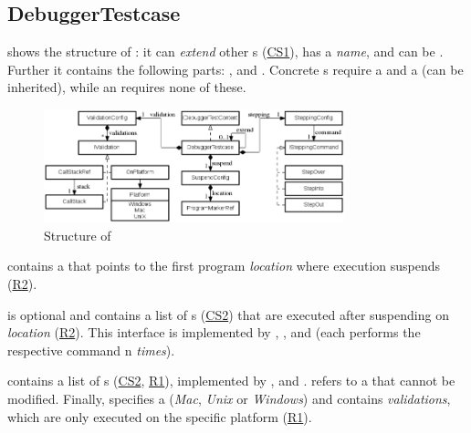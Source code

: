 \subsection{DebuggerTestcase}

 shows the structure of
:
it can \emph{extend} other s (\hyperref[CS1]{CS1}),
has a \emph{name}, and can be . Further it contains the following
parts: ,  and
. Concrete s require  
a  and a  (can be inherited),
while an   requires none of these.
 
\begin{figure}[h]
	\vspace{-3mm}
	\centering
    \includegraphics[width=8.7cm]{./figures/graph4-3.png} 
    \vspace{-3mm}
	\caption{Structure of }
	\label{fig:DebuggerTestcaseStructure}
	\vspace{-2mm}
\end{figure}

 contains a  that points to the first
program \emph{location} where execution suspends (\hyperref[R2]{R2}). 

 is optional and contains a
list of s (\hyperref[CS2]{CS2}) that are executed after
suspending on \emph{location} (\hyperref[R2]{R2}). This interface is implemented by 
, , and  (each performs the
respective command n \emph{times}).

 contains a list of s
(\hyperref[CS2]{CS2}, \hyperref[R1]{R1}), implemented by
,  and .
 refers to a  that cannot
be modified. Finally,  specifies a 
(\emph{Mac}, \emph{Unix} or \emph{Windows}) and contains \emph{validations},
which are only executed on the specific platform (\hyperref[R1]{R1}).

